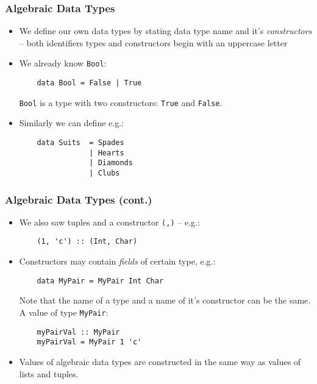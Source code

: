 \documentclass[final,handout]{beamer}
\begin{document}
\begin{frame}[fragile]
    \frametitle{Algebraic Data Types}

    \begin{itemize}
        \item We define our own data types by stating data type name and it's
            \emph{constructors} -- both identifiers types and constructors begin
            with an uppercase letter

        \item<2-> We already know \texttt{Bool}:
            \begin{lstlisting}
    data Bool = False | True
            \end{lstlisting}

            \texttt{Bool} is a type with two constructors: \texttt{True} and
            \texttt{False}.

        \item<3-> Similarly we can define e.g.:

            \begin{lstlisting}
    data Suits  = Spades 
                | Hearts
                | Diamonds
                | Clubs
            \end{lstlisting}
    \end{itemize}
\end{frame}

\begin{frame}[fragile]
    \frametitle{Algebraic Data Types (cont.)}

    \begin{itemize}
        \item<1-> We also saw tuples and a constructor \texttt{(,)} -- e.g.:\\
            \begin{lstlisting}
    (1, 'c') :: (Int, Char)
            \end{lstlisting}

        \item<2-> Constructors may contain \emph{fields} of certain type, e.g.:
            \begin{lstlisting}
    data MyPair = MyPair Int Char
            \end{lstlisting}
            Note that the name of a type  and a name of it's constructor can be
            the same. A value of type \texttt{MyPair}:\\
            \begin{lstlisting}
    myPairVal :: MyPair
    myPairVal = MyPair 1 'c' 
            \end{lstlisting}

        \item<3-> Values of algebraic data types are constructed in the same way
            as values of lists and tuples.
        
    \end{itemize}
\end{frame}
\end{document}
